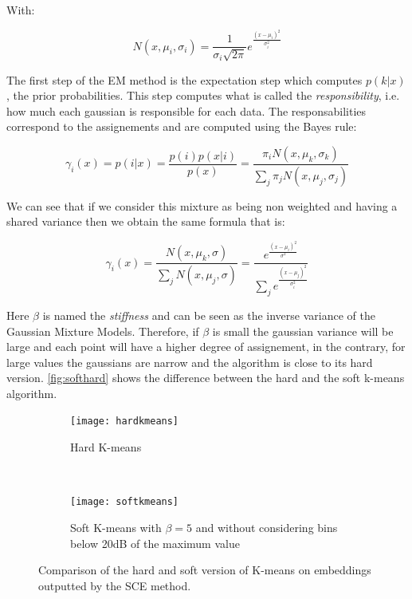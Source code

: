 \documentclass[master, tikz, final,11pt, dvipdfmx]{iscs-thesis}
\begin{document}
With:

\[
N(x, \mu_i,\sigma_i) = \frac{1}{\sigma_i \sqrt{2\pi}} e^{\frac{(x-\mu_i)^2}{\sigma_i^2}}
\]

The first step of the EM method is the expectation step which computes $p(k|x)$, the prior probabilities. This step computes what is called the \textit{responsibility}, i.e. how much each gaussian is responsible for each data. The responsabilities correspond to the assignements and are computed using the Bayes rule:

\[
\gamma_i(x) = p(i|x) = \frac{p(i)p(x|i)}{p(x)} = \frac{\pi_i N(x, \mu_k,\sigma_k)}{\sum_j \pi_j N(x, \mu_j,\sigma_j)}
\]

We can see that if we consider this mixture as being non weighted and having a shared variance then we obtain the same formula that is:

\[
\gamma_i(x) = \frac{N(x, \mu_k,\sigma)}{\sum_j N(x, \mu_j,\sigma)} = \frac{e^{\frac{(x-\mu_i)^2}{\sigma^2}}}{\sum_j e^{\frac{(x-\mu_j)^2}{\sigma_i^2}}} 
\]

Here $\beta$ is named the \textit{stiffness} and can be seen as the inverse variance of the Gaussian Mixture Models. Therefore, if $\beta$ is small the gaussian variance will be large and each point will have a higher degree of assignement, in the contrary, for large values the gaussians are narrow and the algorithm is close to its hard version. \autoref{fig:softhard}
 shows the difference between the hard and the soft k-means algorithm.

\begin{figure}[h]
\centering
\begin{subfigure}[b]{0.45\textwidth}
\texttt{[image: hardkmeans]}
\captionsetup{justification=centering}
\caption{Hard K-means}
\label{fig:hard} 
\end{subfigure}
~
\begin{subfigure}[b]{0.45\textwidth}
\texttt{[image: softkmeans]}
\caption{Soft K-means with $\beta=5$ and without considering bins below 20dB of the maximum value}
\label{fig:soft} 
\end{subfigure}

\caption[Hard and soft K-means comparison]{Comparison of the hard and soft version of K-means on embeddings outputted by the SCE method.}
\label{fig:softhard} 

\end{figure}
\end{document}
